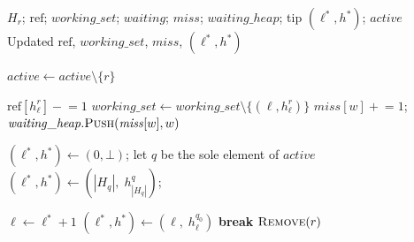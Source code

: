\begin{algorithm}[H]
\caption{$\textsc{Finish}(r)$}
\label{alg:finish}
\begin{algorithmic}[1]
\Require $H_r$; $\mathrm{ref}$; $\mathit{working\_set}$; $\mathit{waiting}$; $\mathit{miss}$; $\mathit{waiting\_heap}$; tip $(\ell^*, h^*)$; $\mathit{active}$
\Ensure Updated $\mathrm{ref}$, $\mathit{working\_set}$, $\mathit{miss}$, $(\ell^*, h^*)$

\State $\mathit{active} \gets \mathit{active} \setminus \{r\}$

  \State $\mathrm{ref}[h_\ell^r] \mathrel{-}= 1$
    \State $\mathit{working\_set} \gets \mathit{working\_set} \setminus \{(\ell, h_\ell^r)\}$
      \State $\mathit{miss}[w] \mathrel{+}= 1$;\quad $\mathit{waiting\_heap}.\textsc{Push}(\mathit{miss}[w], w)$
    \EndFor
  \EndIf
\EndFor

  \State $(\ell^*, h^*) \gets (0, \bot)$;\quad \Return
\EndIf
{}
  \State let $q$ be the sole element of $\mathit{active}$
  \State $(\ell^*, h^*) \gets (|H_q|,\; h_{|H_q|}^q)$;\quad \Return
\EndIf

  \State $\ell \gets \ell^* + 1$
    \State $(\ell^*, h^*) \gets (\ell,\; h_\ell^{q_0})$
  \Else
    \State \textbf{break}
  \EndIf
\EndWhile
\State $\textsc{Remove}(r)$
\end{algorithmic}
\end{algorithm}


